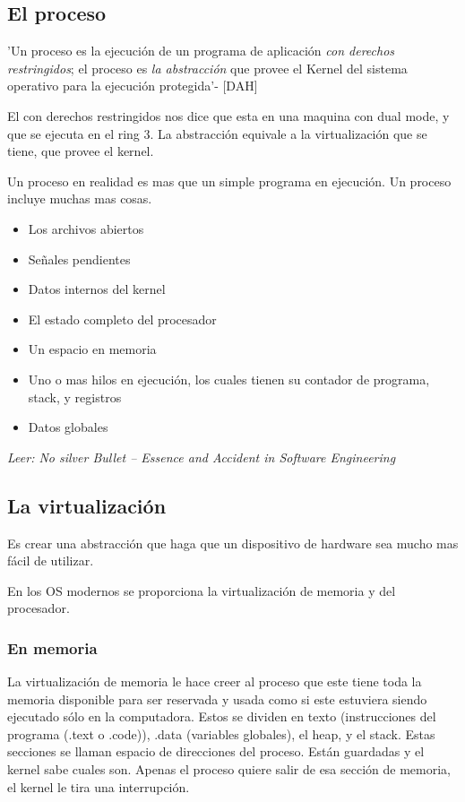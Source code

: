 \documentclass[titlepage,a4paper]{article}
\begin{document}
\subsection*{El proceso}

'Un proceso es la ejecución de un programa de aplicación \textit{con derechos restringidos}; el proceso es \textit{la abstracción} que provee el Kernel del sistema operativo para la ejecución protegida'- [DAH]

El con derechos restringidos nos dice que esta en una maquina con dual mode, y que se ejecuta en el ring 3. La abstracción equivale a la virtualización que se tiene, que provee el kernel.

Un proceso en realidad es mas que un simple programa en ejecución. Un proceso incluye muchas mas cosas.
\begin{itemize}
    \item Los archivos abiertos
    \item Señales pendientes
    \item Datos internos del kernel
    \item El estado completo del procesador
    \item Un espacio en memoria
    \item Uno o mas hilos en ejecución, los cuales tienen su contador de programa, stack, y registros
    \item Datos globales
\end{itemize}

\textit{Leer: No silver Bullet – Essence and Accident in Software Engineering}

\subsection*{La virtualización}

Es crear una abstracción que haga que un dispositivo de hardware sea mucho mas fácil de utilizar.

En los OS modernos se proporciona la virtualización de memoria y del procesador.

\subsubsection*{En memoria}
La virtualización de memoria le hace creer al proceso que este tiene toda la memoria disponible para ser reservada y usada como si este estuviera siendo ejecutado sólo en la computadora. Estos se dividen en texto (instrucciones del programa (.text o .code)), .data (variables globales), el heap, y el stack. Estas secciones se llaman espacio de direcciones del proceso. Están guardadas y el kernel sabe cuales son. Apenas el proceso quiere salir de esa sección de memoria, el kernel le tira una interrupción.
\end{document}
